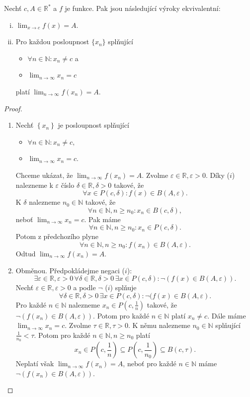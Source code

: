 \begin{veta}[Heine]\label{Heinehoveta}
Nechť $c,A\in \mathbb R ^*$ a $f$ je funkce. Pak jsou následující výroky ekvivalentní:
\begin{enumerate}[(i)]
  \item $\lim_{x\to c} f(x)=A$.
  \item Pro každou posloupnost $\{x_n\}$ splňující
  \begin{itemize}
	\item $\forall n\in \mathbb N :x_n\ne c$ a
	\item $\lim_{n\to\infty} x_n=c$
  \end{itemize}
  platí $\lim_{n\to\infty} f(x_n)=A$.
\end{enumerate}
\end{veta}

\begin{proof}\,
\begin{enumerate}
	\item[$\implies$] Nechť $\left \{ x_n \right \} $ je posloupnost splňující
	\begin{itemize}
		\item $\forall n\in \mathbb N : x_n \ne c,$
		\item $\lim_{n \to \infty} x_n = c$.
	\end{itemize}
	Chceme ukázat, že $\lim_{n \to \infty} f(x_n)=A$. Zvolme $\varepsilon \in \mathbb R , \varepsilon > 0$.
	Díky ($i$) nalezneme k $\varepsilon$ číslo $\delta\in \mathbb R , \delta > 0$ takové, že
	$$
	    \forall x \in P(c,\delta):  f(x) \in B(A,\varepsilon).
	$$
	K $\delta$ nalezneme $n_0 \in \mathbb N $ takové, že
	$$
	    \forall n \in \mathbb N , n \geq n_0: x_n \in B(c,\delta),
	$$
	neboť $\lim_{n \to \infty} x_n = c$. Pak máme
	$$
	    \forall n \in \mathbb N , n \geq n_0: x_n \in P(c,\delta).
	$$
	Potom z předchozího plyne
	$$
	    \forall n \in \mathbb N , n \geq n_0: f(x_n) \in B(A,\varepsilon).
	$$
	Odtud $\lim_{n \to \infty} f(x_n)=A.$
	\item[$\impliedby$] Obměnou. Předpokládejme negaci ($i$):
	$$
	    \exists \varepsilon \in \mathbb R , \varepsilon > 0 \, \forall \delta \in \mathbb R , \delta > 0 \, \exists x \in P(c,\delta): \neg(f(x)\in B(A,\varepsilon)).
	$$
	Nechť $\varepsilon \in \mathbb R , \varepsilon > 0$ a podle $\neg$ ($i$) splňuje
	$$
	    \forall \delta \in \mathbb R , \delta > 0 \, \exists x \in P(c,\delta): \neg (f(x)\in B(A,\varepsilon).
	$$
	Pro každé $n \in \mathbb N $ nalezneme $x_n \in P \left( c, \frac{1}{n} \right ) $ takové, že
	$\neg(f(x_n)\in B(A,\varepsilon))$. Potom pro každé $n \in \mathbb N $ platí $x_n \ne c$.
	Dále máme $\lim_{n \to \infty} x_n = c$. Zvolme $\tau \in \mathbb R , \tau > 0$. K němu nalezneme
	$n_0 \in \mathbb N $ splňující $\frac{1}{n_0} < \tau$. Potom pro každé $n\in \mathbb N , n \geq n_0$
	platí
	$$
	    x_n \in P\left(c, \frac{1}{n}\right) \subseteq P\left(c,\frac{1}{n_0}\right)\subseteq B(c,\tau).
	$$
	Neplatí však $\lim_{n \to \infty} f(x_n)=A$, neboť pro každé $n \in \mathbb N $ máme
	$\neg (f(x_n)\in B(A,\varepsilon))$.\qedhere
\end{enumerate}
\end{proof}

